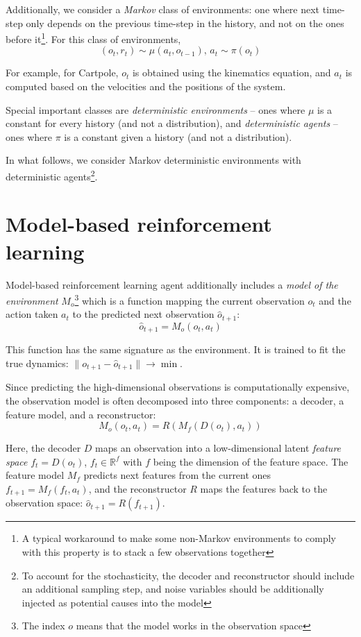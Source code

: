 \documentclass[a4paper,11pt,oneside]{report}
\begin{document}
Additionally, we consider a {\em Markov} class of environments: one where next time-step only depends on the previous time-step in the history, and not on the ones before it\footnote{A typical workaround to make some non-Markov environments to comply with this property is to stack a few observations together}. For this class of environments,
$$
(o_t, r_t)\sim \mu(a_t, o_{t-1}),\,a_t\sim\pi(o_t)
$$

For example, for Cartpole, $o_t$ is obtained using the kinematics equation, and $a_t$ is computed based on the velocities and the positions of the system.

Special important classes are {\em deterministic environments} -- ones where $\mu$ is a constant for every history (and not a distribution), and {\em deterministic agents} -- ones where $\pi$ is a constant given a history (and not a distribution).

In what follows, we consider Markov deterministic environments with deterministic agents\footnote{To account for the stochasticity, the decoder and reconstructor should include an additional sampling step, and noise variables should be additionally injected as potential causes into the model}.


\section{Model-based reinforcement learning}
\label{sec:mbrl}
Model-based reinforcement learning\cite{DeBruin2018,Corneil2018} agent additionally includes a {\em model of the environment} $M_o$\footnote{The index $o$ means that the model works in the observation space} which is a function mapping the current observation $o_t$ and the action taken $a_t$ to the predicted next observation $\hat{o}_{t+1}$:
$$
\hat{o}_{t+1}=M_o(o_t, a_t)
$$

This function has the same signature as the environment. It is trained to fit the true dynamics: $\|o_{t+1}-\hat{o}_{t+1}\|\to\min$.

Since predicting the high-dimensional observations is computationally expensive, the observation model is often decomposed into three components: a decoder, a feature model, and a reconstructor:
$$
M_o(o_t, a_t)=R(M_f(D(o_t), a_t))
$$

Here, the decoder $D$ maps an observation into a low-dimensional latent {\em feature space} $f_t=D(o_t)$, $f_t\in \mathbb R^f$ with $f$ being the dimension of the feature space. The feature model $M_f$ predicts next features from the current ones $f_{t+1}=M_f(f_t,a_t)$, and the reconstructor $R$ maps the features back to the observation space: $\hat{o}_{t+1}=R(f_{t+1})$.
\end{document}
